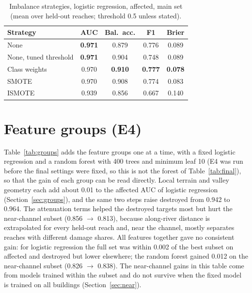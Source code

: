 \documentclass[journal,a4paper]{IEEEtran}
\begin{document}
\begin{table}[t]
\centering\footnotesize
\setlength{\tabcolsep}{3pt}
\caption{Imbalance strategies, logistic regression, affected, main set (mean over held-out reaches; threshold 0.5 unless stated).}\label{tab:imb}
\begin{tabular}{@{}lcccc@{}}
\toprule
\textbf{Strategy} & \textbf{AUC} & \textbf{Bal.\ acc.} & \textbf{F1} & \textbf{Brier}\\
\midrule
None & \textbf{0.971} & 0.879 & 0.776 & 0.089\\
None, tuned threshold & \textbf{0.971} & 0.904 & 0.748 & 0.089\\
Class weights & 0.970 & \textbf{0.910} & \textbf{0.777} & \textbf{0.078}\\
SMOTE & 0.970 & 0.908 & 0.774 & 0.083\\
ISMOTE & 0.939 & 0.856 & 0.667 & 0.140\\
\bottomrule
\end{tabular}
\end{table}

\section{Feature groups (E4)}\label{app:groups}
Table~\ref{tab:groups} adds the feature groups one at a time, with a fixed logistic regression and a random forest with 400 trees and minimum leaf 10 (E4 was run before the final settings were fixed, so this is not the forest of Table~\ref{tab:final}), so that the gain of each group can be read directly. Local terrain and valley geometry each add about 0.01 to the affected AUC of logistic regression (Section~\ref{sec:groups}), and the same two steps raise destroyed from 0.942 to 0.964. The attenuation terms helped the destroyed targets most but hurt the near-channel subset (0.856 $\rightarrow$ 0.813), because along-river distance is extrapolated for every held-out reach and, near the channel, mostly separates reaches with different damage shares. All features together gave no consistent gain: for logistic regression the full set was within 0.002 of the best subset on affected and destroyed but lower elsewhere; the random forest gained 0.012 on the near-channel subset (0.826 $\rightarrow$ 0.838). The near-channel gains in this table come from models trained within the subset and do not survive when the fixed model is trained on all buildings (Section~\ref{sec:near}).
\end{document}
